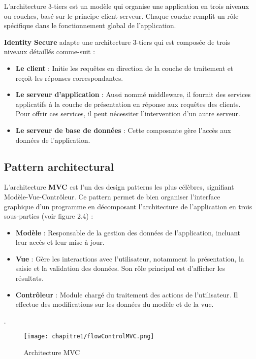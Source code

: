 L'architecture 3-tiers est un modèle qui organise une application en trois niveaux ou couches, basé sur le principe client-serveur. Chaque couche remplit un rôle spécifique dans le fonctionnement global de l'application.

\textbf{Identity Secure} adapte une architecture 3-tiers qui est composée de trois niveaux détaillés comme-suit :
\begin{itemize}
    \item \textbf{  Le client} : Initie les requêtes en direction de la couche de traitement et reçoit les réponses correspondantes.
    \item \textbf{ Le serveur d'application} : Aussi nommé middleware, il fournit des services applicatifs à la couche de présentation en réponse aux requêtes des clients. Pour offrir ces services, il peut nécessiter l'intervention d'un autre serveur.
    \item \textbf{ Le serveur de base de données} : Cette composante gère l'accès aux données de l'application.
\end{itemize}


\subsection{Pattern architectural}
L'architecture \textbf{MVC} est l'un des design patterns les plus célèbres, signifiant Modèle-Vue-Contrôleur. Ce pattern permet de bien organiser l'interface graphique d'un programme en décomposant l'architecture de l'application en trois sous-parties (voir figure 2.4) :

\begin{itemize}
    \item \textbf{Modèle} : Responsable de la gestion des données de l'application, incluant leur accès et leur mise à jour.

    \item \textbf{Vue} : Gère les interactions avec l'utilisateur, notamment la présentation, la saisie et la validation des données. Son rôle principal est d'afficher les résultats.

    \item \textbf{Contrôleur} : Module chargé du traitement des actions de l'utilisateur. Il effectue des modifications sur les données du modèle et de la vue.
\end{itemize}.



\begin{figure}[H]
\centering
\texttt{[image: chapitre1/flowControlMVC.png]}
\caption{Architecture MVC}
\end{figure}


